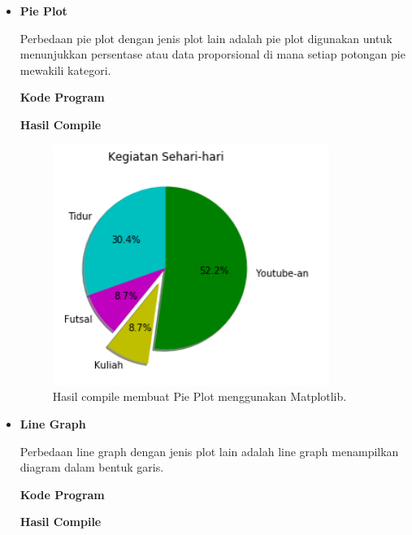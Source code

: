 \begin{enumerate}
\begin{itemize}
				\item \textbf{Pie Plot}
				
				Perbedaan pie plot dengan jenis plot lain adalah pie plot digunakan untuk menunjukkan persentase atau data proporsional di mana setiap potongan pie mewakili kategori.
				
				\textbf{Kode Program}
				
				
				
				\textbf{Hasil Compile}
				
				\begin{figure}[H]
					\includegraphics[width=9cm]{figures/chapter6/1174057/3pie.png}
					\centering
					\caption{Hasil compile membuat Pie Plot menggunakan Matplotlib.}
				\end{figure}
				
				\item \textbf{Line Graph}
				
				Perbedaan line graph dengan jenis plot lain adalah line graph menampilkan diagram dalam bentuk garis.
				
				\textbf{Kode Program}
				
				
				
				\textbf{Hasil Compile}
				

\end{itemize}
\end{enumerate}
